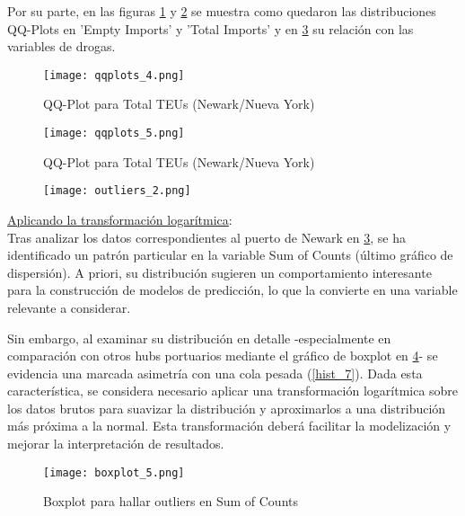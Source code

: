 \documentclass[12pt]{article}
\begin{document}
		Por su parte, en las figuras \ref{qqplots_4} y \ref{qqplots_5} se muestra como quedaron las distribuciones QQ-Plots en 'Empty Imports' y 'Total Imports' y en \ref{outliers_2} su relación con las variables de drogas.
		
		\begin{figure}[H]
			\caption{\label{qqplots_4} QQ-Plot para Total TEUs (Newark/Nueva York)}
			\centering
			\hspace*{1cm}
			\texttt{[image: qqplots\_4.png]}
		\end{figure}
	
		\begin{figure}[H]
			\caption{\label{qqplots_5} QQ-Plot para Total TEUs (Newark/Nueva York)}
			\centering
			\hspace*{1cm}
			\texttt{[image: qqplots\_5.png]}
		\end{figure}
	
		\begin{figure}[H]
			\caption{\label{outliers_2} }
			\centering
			\hspace*{1cm}
			\texttt{[image: outliers\_2.png]}
		\end{figure}
	
		\underline{Aplicando la transformación logarítmica}:\\
		Tras analizar los datos correspondientes al puerto de Newark en \ref{outliers_2}, se ha identificado un patrón particular en la variable Sum of Counts (último gráfico de dispersión).
		A priori, su distribución sugieren un comportamiento interesante para la construcción de modelos de predicción, lo que la convierte en una variable relevante a considerar.
		
		Sin embargo, al examinar su distribución en detalle -especialmente en comparación con otros hubs portuarios mediante el gráfico de boxplot en \ref{boxplot_5}- se evidencia una marcada asimetría con una cola pesada (\ref{hist_7}). Dada esta característica, se considera necesario aplicar una transformación logarítmica sobre los datos brutos para suavizar la distribución y aproximarlos a una distribución más próxima a la normal. Esta transformación deberá facilitar la modelización y mejorar la interpretación de resultados.
		
		\begin{figure}[H]
			\caption{\label{boxplot_5} Boxplot para hallar outliers en Sum of Counts}
			\centering
			\hspace*{1cm}
			\texttt{[image: boxplot\_5.png]}
		\end{figure}
		
\end{document}
